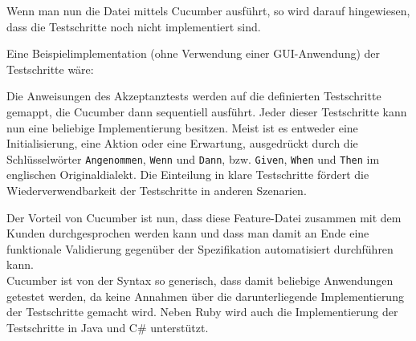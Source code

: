 Wenn man nun die Datei mittels Cucumber ausführt, so wird darauf hingewiesen, dass die Testschritte noch nicht implementiert sind.

Eine Beispielimplementation (ohne Verwendung einer GUI-Anwendung) der Testschritte wäre:
\begin{ruby}[label=features/step\_definitions/steps.rb]
   
     

  
    

  
    

\end{ruby}
Die Anweisungen des Akzeptanztests werden auf die definierten Testschritte gemappt, die Cucumber dann sequentiell ausführt.
Jeder dieser Testschritte kann nun eine beliebige Implementierung besitzen. Meist ist es entweder eine Initialisierung, eine Aktion oder eine Erwartung, ausgedrückt durch die Schlüsselwörter \texttt{Angenommen}, \texttt{Wenn} und \texttt{Dann}, bzw. \texttt{Given}, \texttt{When} und \texttt{Then} im englischen Originaldialekt. Die Einteilung in klare Testschritte fördert die Wiederverwendbarkeit der Testschritte in anderen Szenarien.

Der Vorteil von Cucumber ist nun, dass diese Feature-Datei zusammen mit dem Kunden durchgesprochen werden kann und dass man damit an Ende eine funktionale Validierung gegenüber der Spezifikation automatisiert durchführen kann. \\
Cucumber ist von der Syntax so generisch, dass damit beliebige Anwendungen getestet werden, da keine Annahmen über die darunterliegende Implementierung der Testschritte gemacht wird.
Neben Ruby wird auch die Implementierung der Testschritte in Java und C\# unterstützt.

